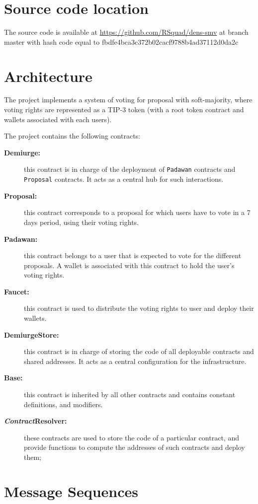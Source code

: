 

\section{Source code location}

The source code is available
at \url{https://github.com/RSquad/dens-smv} at branch master with hash
code equal to fbdfe4bca3c372b02cacf9788b4ad37112d0da2c

\section{Architecture}

The project implements a system of voting for proposal with
soft-majority, where voting rights are represented as a TIP-3 token
(with a root token contract and wallets associated with each users).

The project contains the following contracts:

\begin{description}
\item[\bf Demiurge:] this contract is in charge of the deployment of {\tt Padawan}
contracts and {\tt Proposal} contracts. It acts as a central hub for
such interactions.
\item[\bf Proposal:] this contract corresponds to a proposal for which users
have to vote in a 7 days period, using their voting rights.
\item[\bf Padawan:] this contract belongs to a user that is expected to vote for
the different proposals. A wallet is associated with this contract to
hold the user's voting rights.
\item[\bf Faucet:] this contract is used to distribute the voting rights
to user and deploy their wallets.
\item[\bf DemiurgeStore:] this contract is in charge of storing the code
of all deployable contracts and shared addresses. It acts as a central
configuration for the infrastructure.
\item[\bf Base:] this contract is inherited by all other contracts and contains
constant definitions, and modifiers.
\item[\bf {\em Contract}Resolver:] these contracts are used to store the code of a
particular contract, and provide functions to compute the addresses of such
contracts and deploy them;
\end{description}

\section{Message Sequences}

